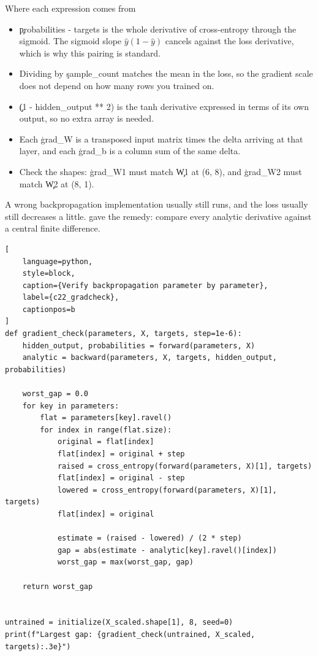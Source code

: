 \begin{SyntaxBox}{Where each expression comes from}
\begin{itemize}
    \item \c{probabilities - targets} is the whole derivative of cross-entropy
          through the sigmoid. The sigmoid slope
          $\hat{y}(1-\hat{y})$ cancels against the loss derivative, which is why
          this pairing is standard.
    \item Dividing by \c{sample_count} matches the mean in the loss, so the
          gradient scale does not depend on how many rows you trained on.
    \item \c{(1 - hidden_output ** 2)} is the tanh derivative expressed in terms
          of its own output, so no extra array is needed.
    \item Each \c{grad_W} is a transposed input matrix times the delta arriving
          at that layer, and each \c{grad_b} is a column sum of the same delta.
    \item Check the shapes: \c{grad_W1} must match \c{W1} at (6, 8), and
          \c{grad_W2} must match \c{W2} at (8, 1).
\end{itemize}
\end{SyntaxBox}


A wrong backpropagation implementation usually still runs, and the loss usually
still decreases a little.  gave the remedy: compare
every analytic derivative against a central finite difference.

\begin{lstlisting}[
    language=python,
    style=block,
    caption={Verify backpropagation parameter by parameter},
    label={c22_gradcheck},
    captionpos=b
]
def gradient_check(parameters, X, targets, step=1e-6):
    hidden_output, probabilities = forward(parameters, X)
    analytic = backward(parameters, X, targets, hidden_output, probabilities)

    worst_gap = 0.0
    for key in parameters:
        flat = parameters[key].ravel()
        for index in range(flat.size):
            original = flat[index]
            flat[index] = original + step
            raised = cross_entropy(forward(parameters, X)[1], targets)
            flat[index] = original - step
            lowered = cross_entropy(forward(parameters, X)[1], targets)
            flat[index] = original

            estimate = (raised - lowered) / (2 * step)
            gap = abs(estimate - analytic[key].ravel()[index])
            worst_gap = max(worst_gap, gap)

    return worst_gap


untrained = initialize(X_scaled.shape[1], 8, seed=0)
print(f"Largest gap: {gradient_check(untrained, X_scaled, targets):.3e}")
\end{lstlisting}

